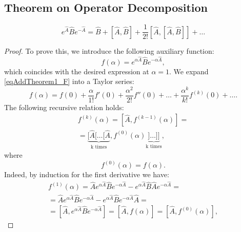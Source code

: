 \subsection{Theorem on Operator Decomposition}
\begin{theorem}
\label{thm:addoperatorequality}
\begin{equation}
e^{\hat{A}}\hat{B}e^{-\hat{A}} = 
\hat{B} + \left[\hat{A},\hat{B}\right] + 
\frac{1}{2!} \left[\hat{A},\left[\hat{A},\hat{B}\right]\right] + \dots
\label{eqAddTheorem1_Main}
\end{equation}
\begin{proof}
To prove this, we introduce the following auxiliary function:
\begin{equation}
f\left(\alpha\right) = 
e^{\alpha\hat{A}}\hat{B}e^{-\alpha\hat{A}},
\label{eqAddTheorem1_F}
\end{equation}
which coincides with the desired expression at $\alpha = 1$. We expand
\eqref{eqAddTheorem1_F} into a Taylor series:
\begin{equation}
f\left(\alpha\right) = 
f\left(0\right) + \frac{\alpha}{1!}f'\left(0\right) +
\frac{\alpha^2}{2!}f''\left(0\right) + 
\dots +
\frac{\alpha^k}{k!}f^{(k)}\left(0\right) + \dots.
\label{eqAddTheorem1_T}
\end{equation}
The following recursive relation holds:
\begin{eqnarray}
f^{(k)}\left(\alpha\right) = \left[\hat{A},
  f^{(k-1)}\left(\alpha\right)\right] = 
\nonumber \\
=
\underbrace{
[\hat{A}[\dots[\hat{A}}_{\mbox{k
  times}},
f^{(0)}\left(\alpha\right)
\underbrace{]\dots]]}_{\mbox{k
  times}},
\label{eqAddTheorem1_rec}
\end{eqnarray}
where 
\[
f^{(0)}\left(\alpha\right) = f\left(\alpha\right).
\]
Indeed, by induction for the first derivative we have:
\begin{eqnarray}
f^{(1)}\left(\alpha\right) = \hat{A}
  e^{\alpha\hat{A}}\hat{B}e^{-\alpha\hat{A}} -
  e^{\alpha\hat{A}}\hat{B}\hat{A}e^{-\alpha\hat{A}} = 
\nonumber \\
= \hat{A}
  e^{\alpha\hat{A}}\hat{B}e^{-\alpha\hat{A}} -
  e^{\alpha\hat{A}}\hat{B}e^{-\alpha\hat{A}}\hat{A} = 
\nonumber \\
=
\left[\hat{A}, e^{\alpha\hat{A}}\hat{B}e^{-\alpha\hat{A}}\right] = 
\left[\hat{A}, f\left(\alpha\right)\right] = 
\left[\hat{A}, f^{(0)}\left(\alpha\right)\right],
\label{eqAddTheorem1_rec_1}
\end{eqnarray}

\end{proof}
\end{theorem}
